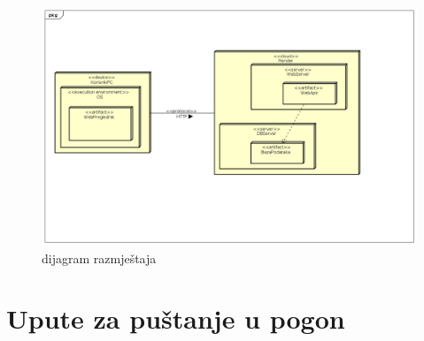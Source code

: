 			 \begin{figure}[H]
			\includegraphics[width=\textwidth]{slike/dijagramRazmjestaja.png} %
			\caption{dijagram razmještaja}
			\label{fig:dijagramRazmjestaja} %
			\end{figure}
			
			\eject 
		
		\section{Upute za puštanje u pogon}
		
		
			
			
			 
